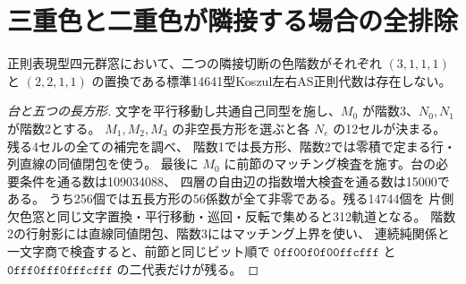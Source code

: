 \section{三重色と二重色が隣接する場合の全排除}
\label{sec:klein-mixed-positive}
\begin{theorem}\label{thm:klein-mixed-positive}
正則表現型四元群窓において、二つの隣接切断の色階数がそれぞれ
$(3,1,1,1)$ と $(2,2,1,1)$ の置換である標準14641型Koszul左右AS正則代数は存在しない。
\end{theorem}
\begin{proof}[台と五つの長方形]
文字を平行移動し共通自己同型を施し、$M_0$ が階数3、$N_0,N_1$ が階数2とする。
$M_1,M_2,M_3$ の非空長方形を選ぶと各 $N_e$ の12セルが決まる。残る4セルの全ての補完を調べ、
階数1では長方形、階数2では零積で定まる行・列直線の同値閉包を使う。
最後に $M_0$ に前節のマッチング検査を施す。台の必要条件を通る数は109034088、
四層の自由辺の指数増大検査を通る数は15000である。
うち256個では五長方形の56係数が全て非零である。残る14744個を
片側欠色窓と同じ文字置換・平行移動・巡回・反転で集めると312軌道となる。
階数2の行射影には直線同値閉包、階数3にはマッチング上界を使い、
連続純関係と一文字商で検査すると、前節と同じビット順で
$\mathtt{0ff00f0f00ffcfff}$ と $\mathtt{0fff0fff0fffcfff}$ の二代表だけが残る。
\end{proof}

